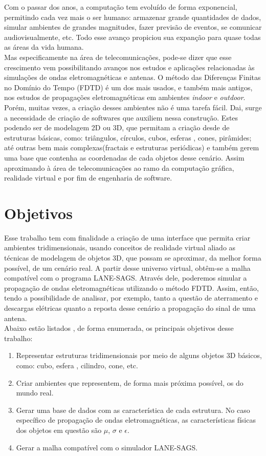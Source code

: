 Com o passar dos anos, a computação tem evoluído de forma exponencial\cite{comp_history}, permitindo cada vez mais o ser humano: armazenar grande quantidades de dados, simular ambientes de grandes magnitudes, fazer previsão de eventos, se comunicar audiovisualmente, etc. Todo esse avanço propiciou sua expanção para quase todas as áreas da vida humana.\\

Mas especificamente na área de telecomunicações, pode-se dizer que esse crescimento vem possibilitando avanços nos estudos e aplicações relacionadas às simulações de ondas eletromagnéticas e antenas. O método das Diferenças Finitas no Domínio do Tempo (FDTD)\cite{fdtd_intro} é um dos mais usados, e também mais antigos, nos estudos de propagações eletromagnéticas em ambientes \textit{indoor} e \textit{outdoor}\cite{rodrigo_intro}.\\

Porém, muitas vezes, a criação desses ambientes não é uma tarefa fácil. Dai, surge a necessidade de criação de softwares que auxiliem nessa construção. Estes podendo ser de modelagem 2D ou 3D, que permitam a criação desde de estruturas básicas, como: triângulos, círculos, cubos, esferas , cones, pirâmides; até outras bem mais complexas(fractais e estruturas periódicas) e também gerem uma base que contenha as coordenadas de cada objetos desse cenário. Assim aproximando à área de telecomunicações ao ramo da computação gráfica, realidade virtual e por fim de engenharia de software.

\section{Objetivos}
Esse trabalho tem com finalidade a criação de uma interface que permita criar ambientes tridimensionais, usando conceitos de realidade virtual aliado as técnicas de modelagem de objetos 3D, que possam se aproximar, da melhor forma possível, de um cenário real. A partir desse universo virtual, obtêm-se a malha compatível com o programa LANE-SAGS.  Através dele, poderemos simular a propagação de ondas eletromagnéticas utilizando o método FDTD. Assim, então, tendo a possibilidade de analisar, por exemplo, tanto a questão de aterramento e descargas elétricas quanto a reposta desse cenário a propagação do sinal de uma antena.\\

Abaixo estão listados , de forma enumerada, os principais objetivos desse trabalho:
\begin{enumerate}
\item {Representar estruturas tridimensionais por meio de alguns objetos 3D básicos, como: cubo, esfera , cilindro, cone, etc.}
\item {Criar ambientes que representem, de forma mais próxima possível, os do mundo real. }
\item {Gerar uma base de dados com as característica de cada estrutura. No caso específico de propagação de ondas eletromagnéticas, as características físicas dos objetos em questão são $\mu$, $\sigma$ e $\epsilon$.}
\item {Gerar a malha compatível com o simulador LANE-SAGS.}
\end{enumerate}

